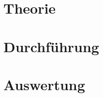\documentclass[12pt,a4paper,titlepage,headinclude,bibtotoc]{scrartcl}
\begin{document}
\section{Theorie}
\label{sec:theorie}
                                                                                                                                                                      

\section{Durchführung}
\label{sec:durchfuehrung}


\section{Auswertung}
\label{sec:auswertung}
\end{document}
